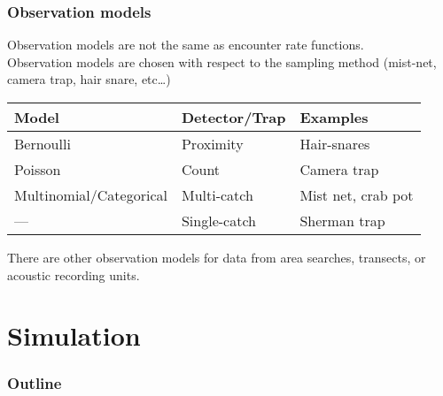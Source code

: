 \documentclass[color=usenames,dvipsnames]{beamer}\usepackage[]{graphicx}\usepackage[]{color}
\begin{document}
\begin{frame}
  \frametitle{Observation models}
  Observation models are not the same as encounter rate functions. \\
  \pause \vfill
  Observation models are chosen with respect to the sampling
      method (mist-net, camera trap, hair snare, etc\dots) \\
  \pause \vfill
  \centering
    \begin{tabular}{lll}
      \hline
      Model       & Detector/Trap     & Examples           \\
      \hline
      Bernoulli   & Proximity    & Hair-snares        \\
      Poisson     & Count        & Camera trap        \\
      Multinomial/Categorical & Multi-catch  & Mist net, crab pot \\
      ---          & Single-catch & Sherman trap       \\
      \hline
    \end{tabular}
  \pause \vfill
  There are other observation models for data from area searches,
  transects, or acoustic recording units.
\end{frame}








\section{Simulation}


\begin{frame}
  \frametitle{Outline}
  \Large
  \tableofcontents[currentsection]
\end{frame}




\end{document}
